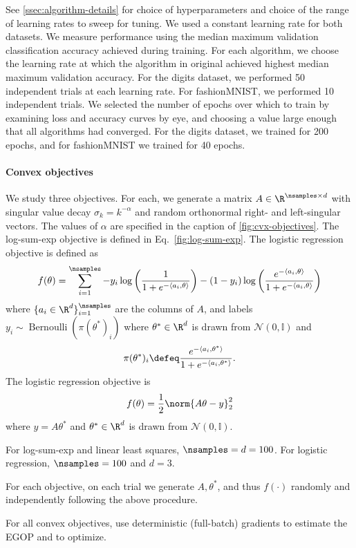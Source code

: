 See \cref{ssec:algorithm-details} for choice of  hyperparameters and choice of the range of learning rates to sweep for tuning. We used a constant learning rate for both datasets. We measure performance using the median maximum validation classification accuracy achieved during training. For each algorithm, we choose the learning rate at which the algorithm in original achieved highest median maximum validation accuracy. For the digits dataset, we performed 50 independent trials at each learning rate. For fashionMNIST, we performed 10 independent trials. We selected the number of epochs over which to train by examining loss and accuracy curves by eye, and choosing a value large enough that all algorithms had converged. For the digits dataset, we trained for 200 epochs, and for fashionMNIST we trained for 40 epochs.

\paragraph{Convex objectives} We study three objectives. For each, we generate a matrix $A \in \R^{\nsamples\times d}$ with singular value decay $\sigma_k = k^{-\alpha}$ and random orthonormal right- and left-singular vectors. The values of $\alpha$ are specified in the caption of \cref{fig:cvx-objectives}. The log-sum-exp objective is defined in Eq.~\ref{fig:log-sum-exp}. The logistic regression objective is defined as
\[
    f(\theta) = \sum_{i=1}^{\nsamples} -y_i \log\left(\frac{1}{1+e^{-\langle a_i, \theta\rangle}}\right) -(1-y_i)\log\left(\frac{e^{-\langle a_i, \theta\rangle}}{1+e^{-\langle a_i, \theta\rangle}}\right)
\]
where $\{a_i\in \R^d\}_{i=1}^{\nsamples}$ are the columns of $A$, and labels $y_i\sim \operatorname{Bernoulli}(\pi(\theta^*)_i)$ where $\theta^* \in \R^d$ is drawn from $\mathcal{N}(0, \mathbb{I})$ and 
\[
    \pi(\theta^*)_i \defeq \frac{e^{-\langle a_i, \theta^*\rangle}}{1+e^{-\langle a_i, \theta^*\rangle}}.
\]
The logistic regression objective is 
\[
    f(\theta) = \frac{1}{2}\norm{A\theta-y}^2_2
\]
where $y=A\theta^*$ and $\theta^*\in \R^d$ is drawn from $\mathcal{N}(0, \mathbb{I})$.

For log-sum-exp and linear least squares, $\nsamples=d=100$. For logistic regression, $\nsamples=100$ and $d=3$.

For each objective, on each trial we generate $A, \theta^*$, and thus $f(\cdot)$ randomly and independently following the above procedure.

For all convex objectives, use deterministic (full-batch) gradients to estimate the EGOP and to optimize.

